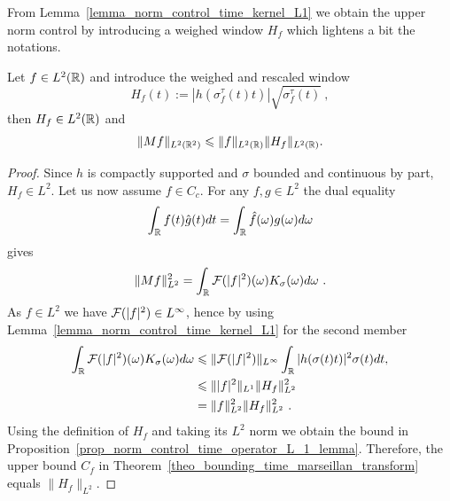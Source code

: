 From Lemma~\ref{lemma_norm_control_time_kernel_L1} we obtain the upper norm control by introducing a weighed window $H_f$ which lightens a bit the notations.
\begin{prop}\label{prop_norm_control_time_operator_L_1_lemma}
	Let $f\in L^2(\mathbb{R})$ and introduce the weighed and rescaled window
	\begin{equation}
		H_f(t) := |h(\sigma_f^\tau(t)t)|\sqrt{\sigma_f^\tau(t)}\ ,
	\end{equation}
	then $H_f\in L^2(\mathbb{R})$ and
	\begin{equation}
		\|Mf\|_{L^2(\mathbb{R}^2)} \leqslant \|f\|_{L^2(\mathbb{R})}\|H_f\|_{L^2(\mathbb{R})}.
	\end{equation}
\end{prop}
\begin{proof}
Since $h$ is compactly supported and $\sigma$ bounded and continuous by part, $H_f\in L^2$. Let us now assume $f\in C_c$. For any $f,g\in L^2$ the dual equality
	\begin{equation*}
		\int_{\mathbb{R}} f(t)\hat{g}(t)dt = \int_{\mathbb{R}} \hat{f}(\omega)g(\omega)d\omega
	\end{equation*}
	gives
	\begin{equation*}
		\|Mf\|_{L^2}^2 = \int_{\mathbb{R}} \mathcal{F}(|f|^2)(\omega)K_\sigma(\omega)d\omega\ .
	\end{equation*}
	As $f\in L^2$ we have $\mathcal{F}(|f|^2)\in L^\infty$, hence by using Lemma~\ref{lemma_norm_control_time_kernel_L1} for the second member
	\begin{align*}
		\int_{\mathbb{R}} \mathcal{F}(|f|^2)(\omega)K_\sigma(\omega)d\omega & \leqslant \| \mathcal{F}(|f|^2)\|_{L^\infty}\int_{\mathbb{R}} |h(\sigma(t)t)|^2\sigma(t)dt, \\
		& \leqslant \| |f|^2 \|_{L^1} \| H_f\|_{L^2}^2 \\
		& = \|f\|_{L^2}^2 \|H_f \|_{L^2}^2\ .				
	\end{align*}
	Using the definition of $H_f$ and taking its $L^2$ norm we obtain the bound in Proposition~\ref{prop_norm_control_time_operator_L_1_lemma}. Therefore, the upper bound $C_f$ in Theorem~\ref{theo_bounding_time_marseillan_transform} equals $\|H_f\|_{L^2}$.


\end{proof}
